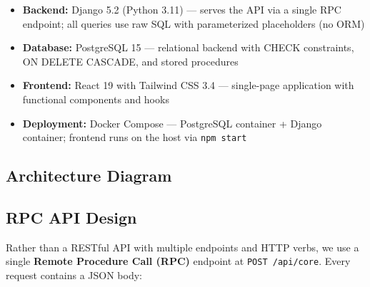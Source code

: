 \documentclass[11pt]{article}
\begin{document}
\begin{itemize}
    \item \textbf{Backend:} Django 5.2 (Python 3.11) --- serves the API via a single RPC endpoint; all queries use raw SQL with parameterized placeholders (no ORM)
    \item \textbf{Database:} PostgreSQL 15 --- relational backend with CHECK constraints, ON DELETE CASCADE, and stored procedures
    \item \textbf{Frontend:} React 19 with Tailwind CSS 3.4 --- single-page application with functional components and hooks
    \item \textbf{Deployment:} Docker Compose --- PostgreSQL container + Django container; frontend runs on the host via \texttt{npm start}
\end{itemize}

\subsection{Architecture Diagram}

\begin{center}
\end{center}

\subsection{RPC API Design}

Rather than a RESTful API with multiple endpoints and HTTP verbs, we use a single \textbf{Remote Procedure Call (RPC)} endpoint at \texttt{POST /api/core}. Every request contains a JSON body:
\end{document}
